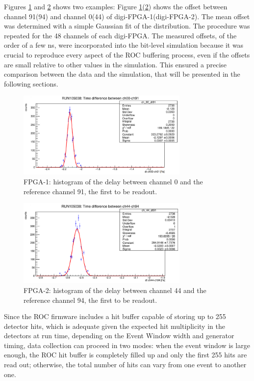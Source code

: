 Figures \ref{fig:delay1} and \ref{fig:delay2} shows two examples: 
Figure \ref{fig:delay1}(\ref{fig:delay2}) shows the offset between 
channel 91(94) and channel 0(44) of digi-FPGA-1(digi-FPGA-2). 
The mean offset was determined with a simple Gaussian fit of the distribution. 
The procedure was repeated for the 48 channels of each digi-FPGA.
The measured offsets, of the order of a few ns, were incorporated 
into the bit-level simulation because it was crucial to reproduce 
every aspect of the ROC buffering process, even if the offsets 
are small relative to other values in the simulation. This ensured a precise 
comparison between the data and the simulation, that will be 
presented in the following sections.
  \begin{figure}[!h]
          \centering
      \includegraphics[width=0.75\textwidth]{figures/png/Screenshot from 2023-12-03 11-50-50.png}
      \caption{FPGA-1: histogram of the delay between channel 0 and the reference channel 91, the first to be readout.}
      \label{fig:delay1}
    \end{figure}
    \begin{figure}[!h]
          \centering
      \includegraphics[width=0.75\textwidth]{figures/png/Screenshot from 2023-12-03 11-50-33.png}
      \caption{FPGA-2: histogram of the delay between channel 44 and the reference channel 94, the first to be readout.}
      \label{fig:delay2}
    \end{figure}
    Since the ROC firmware includes a hit buffer capable of storing up to 
    255 detector hits, which is adequate given the expected hit multiplicity 
    in the detectors at run time, depending on the Event Window width and generator timing, 
    data collection can proceed in two modes: when the event window is large enough, 
    the ROC hit buffer is completely filled up and only the first 255 hits are read out; 
    otherwise, the total number of hits can vary from one event to another one.
